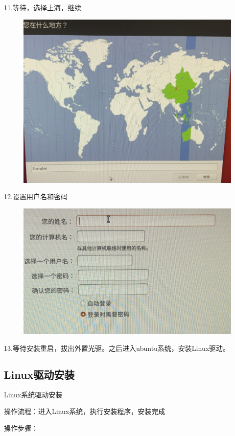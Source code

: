 \documentclass[openbib]{article}
\begin{document}
11.等待，选择上海，继续
\begin{figure}[H]
	\centering
	\includegraphics[scale=0.3]{37}
\end{figure}

12.设置用户名和密码
\begin{figure}[H]
	\centering
	\includegraphics[scale=0.3]{38}
\end{figure}

13.等待安装重启，拔出外置光驱。之后进入ubuntu系统，安装Linux驱动。
\subsection{Linux驱动安装}
Linux系统驱动安装

操作流程：进入Linux系统，执行安装程序，安装完成

操作步骤：
\end{document}
